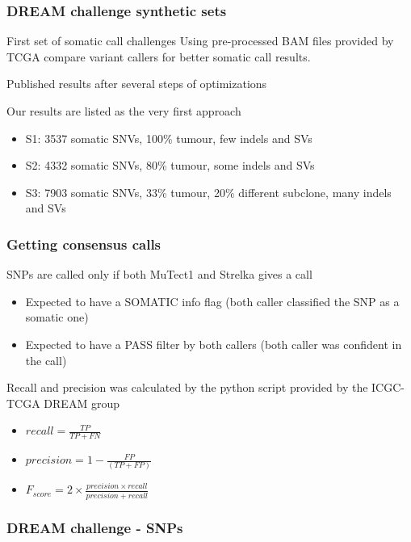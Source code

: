 \documentclass{beamer}
\begin{document}
\begin{frame}
\frametitle{DREAM challenge synthetic sets}
	\begin{block}{First set of somatic call challenges}
            Using pre-processed BAM files provided by TCGA compare variant callers for better somatic call results.

            Published results after several steps of optimizations

            Our results are listed as the very first approach

	    \begin{itemize}
		\item S1: 3537 somatic SNVs, 100\% tumour, few indels and SVs
		\item S2: 4332 somatic SNVs, 80\% tumour, some indels and SVs
		\item S3: 7903 somatic SNVs, 33\% tumour, 20\% different subclone, many indels and SVs
	    \end{itemize}
	\end{block}
\end{frame}

\begin{frame}
\frametitle{Getting consensus calls}
    \begin{block}{SNPs are called only if both MuTect1 and Strelka gives a call}
        \begin{itemize}
            \item Expected to have a SOMATIC info flag (both caller classified the SNP as a somatic one)
            \item Expected to have a PASS filter by both callers (both caller was confident in the call)
        \end{itemize}
        Recall and precision was calculated by the python script provided by the ICGC-TCGA DREAM group
        \begin{itemize}
            \item $ recall = \frac{TP}{TP + FN}$
            \item $ precision = 1 - \frac{FP}{(TP + FP)}$
            \item $ F_{score} = 2 \times \frac{precision \times recall}{precision + recall}$
        \end{itemize}
    \end{block}
\end{frame}

\begin{frame}
\frametitle{DREAM challenge - SNPs}
\end{frame}
\end{document}
